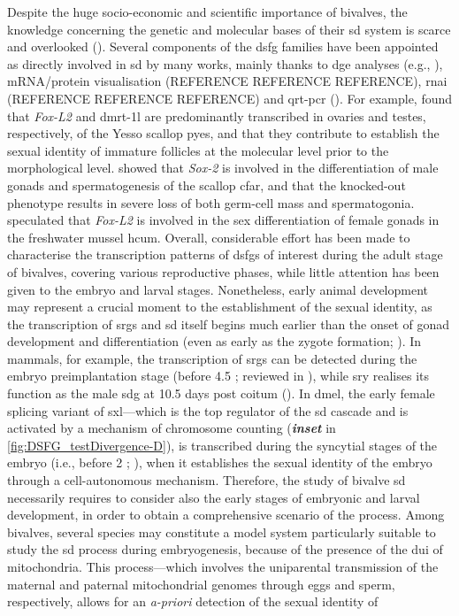 Despite the huge socio-economic and scientific importance of bivalves, the knowledge concerning the genetic and molecular bases of their \gls{sd} system is scarce and overlooked (). Several components of the \gls{dsfg} families have been appointed as directly involved in \gls{sd} by many works, mainly thanks to \gls{dge} analyses (e.g., ), mRNA/protein visualisation (REFERENCE REFERENCE REFERENCE), \gls{rnai} (REFERENCE REFERENCE REFERENCE) and \gls{qrt-pcr} (). For example,  found that \textit{Fox-L2} and \gls{dmrt-1l} are predominantly transcribed in ovaries and testes, respectively, of the Yesso scallop \gls{pyes}, and that they contribute to establish the sexual identity of immature follicles at the molecular level prior to the morphological level.  showed that \textit{Sox-2} is involved in the differentiation of male gonads and spermatogenesis of the scallop \gls{cfar}, and that the knocked-out phenotype results in severe loss of both germ-cell mass and spermatogonia.  speculated that \textit{Fox-L2} is involved in the sex differentiation of female gonads in the freshwater mussel \gls{hcum}. Overall, considerable effort has been made to characterise the transcription patterns of \glspl{dsfg} of interest during the adult stage of bivalves, covering various reproductive phases, while little attention has been given to the embryo and larval stages. Nonetheless, early animal development may represent a crucial moment to the establishment of the sexual identity, as the transcription of \glspl{srg} and \gls{sd} itself begins much earlier than the onset of gonad development and differentiation (even as early as the zygote formation; ). In mammals, for example, the transcription of \glspl{srg} can be detected during the embryo preimplantation stage (before 4.5 ; reviewed in ), while \gls{sry} realises its function as the male \gls{sdg} at 10.5 days post coitum (). In \gls{dmel}, the early female splicing variant of \gls{sxl}---which is the top regulator of the \gls{sd} cascade and is activated by a mechanism of chromosome counting (\textbf{\textit{inset}} in \cref{fig:DSFG_testDivergence-D}), is transcribed during the syncytial stages of the embryo (i.e., before 2 ; ), when it establishes the sexual identity of the embryo through a cell-autonomous mechanism. Therefore, the study of bivalve \gls{sd} necessarily requires to consider also the early stages of embryonic and larval development, in order to obtain a comprehensive scenario of the process. Among bivalves, several species may constitute a model system particularly suitable to study the \gls{sd} process during embryogenesis, because of the presence of the \gls{dui} of mitochondria. This process---which involves the uniparental transmission of the maternal and paternal mitochondrial genomes through eggs and sperm, respectively, allows for an \textit{a-priori} detection of the sexual identity of 